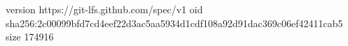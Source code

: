 version https://git-lfs.github.com/spec/v1
oid sha256:2c00099bfd7cd4eef22d3ac5aa5934d1cdf108a92d91dac369c06ef42411cab5
size 174916
